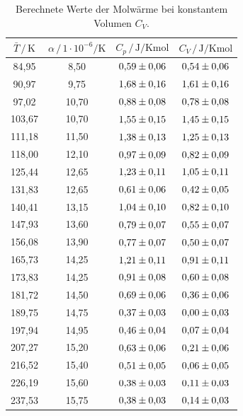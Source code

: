 \begin{table}
    \centering
    \caption{Berechnete Werte der Molwärme bei konstantem Volumen $C_V$.}
    \label{tab:mess2}
    \begin{tabular}{c c c c}
    \toprule
    $\bar{T} \,/\, \si{\kelvin}$ & $\alpha \,/\, 1\cdot 10^{-6}\si{\per\kelvin}$ & $C_p \,/\, \si{\joule\per\kelvin\mole}$
    & $C_V \,/\, \si{\joule\per\kelvin\mole}$\\
    \midrule 
         84,95 &  8,50 & $\num{0.59+-0.06}$ & $\num{0.54+-0.06}$\\
         90,97 &  9,75 & $\num{1.68+-0.16}$ & $\num{1.61+-0.16}$\\
         97,02 & 10,70 & $\num{0.88+-0.08}$ & $\num{0.78+-0.08}$\\
        103,67 & 10,70 & $\num{1.55+-0.15}$ & $\num{1.45+-0.15}$\\
        111,18 & 11,50 & $\num{1.38+-0.13}$ & $\num{1.25+-0.13}$\\
        118,00 & 12,10 & $\num{0.97+-0.09}$ & $\num{0.82+-0.09}$\\
        125,44 & 12,65 & $\num{1.23+-0.11}$ & $\num{1.05+-0.11}$\\
        131,83 & 12,65 & $\num{0.61+-0.06}$ & $\num{0.42+-0.05}$\\
        140,41 & 13,15 & $\num{1.04+-0.10}$ & $\num{0.82+-0.10}$\\
        147,93 & 13,60 & $\num{0.79+-0.07}$ & $\num{0.55+-0.07}$\\
        156,08 & 13,90 & $\num{0.77+-0.07}$ & $\num{0.50+-0.07}$\\
        165,73 & 14,25 & $\num{1.21+-0.11}$ & $\num{0.91+-0.11}$\\
        173,83 & 14,25 & $\num{0.91+-0.08}$ & $\num{0.60+-0.08}$\\
        181,72 & 14,50 & $\num{0.69+-0.06}$ & $\num{0.36+-0.06}$\\
        189,75 & 14,75 & $\num{0.37+-0.03}$ & $\num{0.00+-0.03}$\\
        197,94 & 14,95 & $\num{0.46+-0.04}$ & $\num{0.07+-0.04}$\\
        207,27 & 15,20 & $\num{0.63+-0.06}$ & $\num{0.21+-0.06}$\\
        216,52 & 15,40 & $\num{0.51+-0.05}$ & $\num{0.06+-0.05}$\\
        226,19 & 15,60 & $\num{0.38+-0.03}$ & $\num{0.11+-0.03}$\\
        237,53 & 15,75 & $\num{0.38+-0.03}$ & $\num{0.14+-0.03}$\\

\end{tabular}
\end{table}
